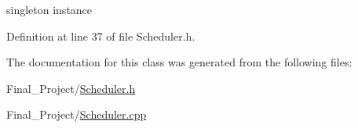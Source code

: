 singleton instance 



Definition at line 37 of file Scheduler.\-h.



The documentation for this class was generated from the following files\-:\begin{DoxyCompactItemize}
\item 
Final\-\_\-\-Project/\hyperlink{Scheduler_8h}{Scheduler.\-h}\item 
Final\-\_\-\-Project/\hyperlink{Scheduler_8cpp}{Scheduler.\-cpp}\end{DoxyCompactItemize}
